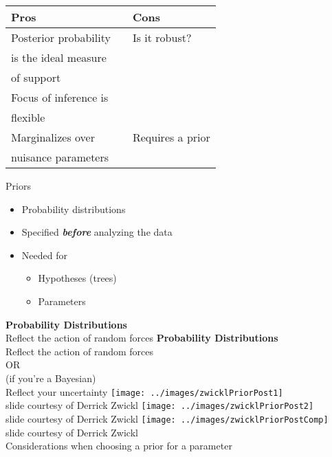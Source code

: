 \documentclass{seminar}
\begin{document}
\begin{slide}
\begin{tabular}{lcl}
	{\bf Pros}  & \vline & {\bf Cons} \\ \hline
	Posterior probability &\vline & Is it robust?\\
	is the ideal measure &\vline &\\
	of support & \vline& \\ \hline
	Focus of inference is	& \vline& \\
	flexible & \vline&	\\ \hline
	Marginalizes over  & \vline&  Requires a prior \\ 
	nuisance parameters & \vline &\\ 
\end{tabular}
\centerslidesfalse
\newslide  %
\Large Priors\large\\[30pt]
\begin{itemize}
	\item Probability distributions
	\item Specified {\bf \em before} analyzing the data
	\item Needed for
		\begin{itemize}
			\item Hypotheses (trees)
			\item Parameters
		\end{itemize}
\end{itemize}
\newslide
\Large
{\bf Probability Distributions} \\[20pt]
Reflect the action of random forces
\newslide
{\bf Probability Distributions} \\[20pt]
Reflect the action of random forces\\[30pt]
OR\\[20pt]
 (if you're a Bayesian)\\[20pt]
Reflect your uncertainty
\newslide
\texttt{[image: ../images/zwicklPriorPost1]}\\
\tiny slide courtesy of Derrick Zwickl
\newslide
\texttt{[image: ../images/zwicklPriorPost2]}\\
slide courtesy of Derrick Zwickl
\newslide
\texttt{[image: ../images/zwicklPriorPostComp]}\\
slide courtesy of Derrick Zwickl\\
\newslide
\Large	Considerations when choosing a prior for a parameter

\end{slide}
\end{document}

